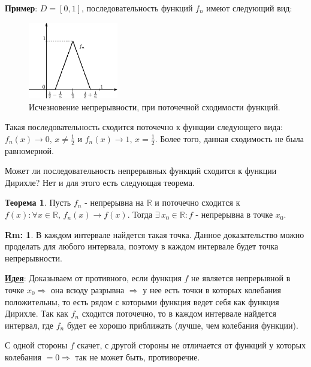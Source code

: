 \documentclass[12pt]{article}
\newcommand{\MR}{\mathbb{R}}
\theoremstyle{definition}
\newtheorem{rem}{Rm:}
\newtheorem{theorem}{Теорема}
\begin{document}
\textbf{Пример}: $D = [0,1]$, последовательность функций $f_n$ имеют следующий вид:
\begin{figure}[H]
	\centering
	\includegraphics[width=0.35\textwidth]{20_7.eps}
	\caption{Исчезновение непрерывности, при поточечной сходимости функций.}
	\label{20_7}
\end{figure}
Такая последовательность сходится поточечно к функции следующего вида: \\
$f_n(x) \to 0, \, x \neq \frac{1}{2}$ и $f_n(x) \to 1, \, x = \frac{1}{2}$.
Более того, данная сходимость не была равномерной.

Может ли последовательность непрерывных функций сходится к функции Дирихле? Нет и для этого есть следующая теорема.

\begin{theorem}
	Пусть $f_n$ - непрерывна на $\MR$ и поточечно сходится к $f(x) \colon \forall x \in \MR, \, f_n(x) \to f(x)$. Тогда $\exists \, x_0 \in \MR \colon f$ - непрерывна в точке $x_0$.
\end{theorem}
\begin{rem}
	В каждом интервале найдется такая точка. Данное доказательство можно проделать для любого интервала, поэтому в каждом интервале будет точка непрерывности.
\end{rem}

\uline{\textbf{Идея}}: Доказываем от противного, если функция $f$ не является непрерывной в точке $x_0 \Rightarrow$ она всюду разрывна $\Rightarrow$ у нее есть точки в которых колебания положительны, то есть рядом с которыми функция ведет себя как функция Дирихле. Так как $f_n$ сходится поточечно, то в каждом интервале найдется интервал, где $f_n$ будет ее хорошо приближать (лучше, чем колебания функции).

С одной стороны $f$ скачет, с другой стороны не отличается от функций у которых колебания $= 0 \Rightarrow$ так не может быть, противоречие.
\end{document}
